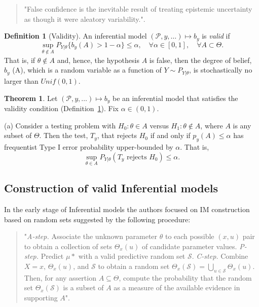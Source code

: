 \documentclass[
]{report}
\theoremstyle{definition}
\newtheorem{theorem}{Theorem}
\theoremstyle{definition}
\newtheorem{definition}{Definition}[section]
\begin{document}
\begin{quote}
"False confidence is the inevitable result of treating epistemic uncertainty as though it were aleatory variability."\cite{balch_satellite_2019}.
\end{quote}

\begin{definition}[Validity]\label{def:validity}
An inferential model $( \mathscr{P},y, \dots) \mapsto b_y$ is \textit{valid} if
$$\sup_{\theta \notin A} P_{Y|\theta} \{b_y (A) > 1- \alpha \} \leq \alpha , \quad \forall \alpha \in [0, 1], \quad \forall A \subset \Theta .$$
That is, if $\theta \notin A$ and, hence, the hypothesis $A$ is false, then the degree of belief, $b_y$ (A), which is a random variable as a function of $Y \sim P_{Y|\theta}$, is stochastically no larger than $Unif(0,1)$.
\end{definition}

\begin{theorem}
Let $(\mathscr{P}, y, \dots) \mapsto b_y$ be an inferential model that satisfies the validity condition (Definition~\ref{def:validity}). Fix $\alpha \in (0,1)$.

(a) Consider a testing problem with $H_0 : \theta \in A$ versus $H_1 : \theta \notin A$, where $A$ is any subset of $\Theta$. Then the test, $T_y$, that rejects $H_0$ if and only if $p_y(A) \leq \alpha$ has frequentist Type I error probability upper-bounded by $\alpha$. That is,
$$\sup_{\theta \in A} P_{Y|\theta} (T_y \text{ rejects } H_0) \leq \alpha .$$
\end{theorem}

\subsection{Construction of valid Inferential models}

In the early stage of Inferential models the authors focused on IM
construction based on random sets suggested by the following procedure:

\begin{quote}
"\textit{A-step. } Associate the unknown parameter $\theta$ to each possible $(x, u)$ pair to obtain a collection of sets $\Theta_x(u)$ of candidate parameter values. \newline
\textit{P-step. } Predict $\mu*$ with a valid predictive random set $\mathcal{S}$. \newline
\textit{C-step. } Combine $X = x, \, \Theta_x (u)$, and $\mathcal{S}$ to obtain a random set $\Theta_x (\mathcal{S}) = \bigcup_{u \in {\mathcal{S}}} \Theta_x(u)$. Then, for any assertion $A \subseteq \Theta$, compute the probability that the random set $\Theta_x (\mathcal{S})$ is a subset of $A$ as a measure of the available evidence in supporting $A$"\cite{martin_inferential_2013}.
\end{quote}
\end{document}
